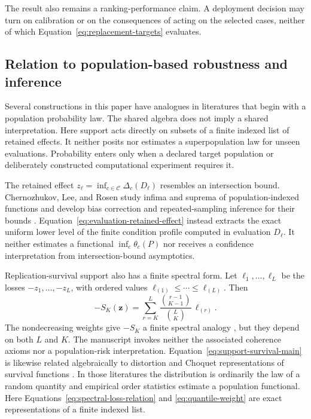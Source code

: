 \documentclass[11pt]{article}
\newcommand{\CSet}{\mathcal{C}}
\theoremstyle{remark}
\begin{document}
The result also remains a ranking-performance claim. A deployment decision may turn on calibration or on the consequences of acting on the selected cases, neither of which Equation~\eqref{eq:replacement-targets} evaluates.

\subsection{Relation to population-based robustness and inference}
\label{sec:related-frameworks}

Several constructions in this paper have analogues in literatures that begin
with a population probability law. The shared algebra does not imply a shared
interpretation. Here support acts directly on subsets of a finite indexed list
of retained effects. It neither posits nor estimates a superpopulation law for
unseen evaluations. Probability enters only when a declared target population
or deliberately constructed computational experiment requires it.

The retained effect $z_\ell=\inf_{c\in\CSet}\Delta_c(D_\ell)$ resembles an
intersection bound. Chernozhukov, Lee, and Rosen study infima and suprema of
population-indexed functions and develop bias correction and repeated-sampling
inference for their bounds \cite{chernozhukov2013intersection}. Equation~\eqref{eq:evaluation-retained-effect}
instead extracts the exact uniform lower level of the finite condition profile
computed in evaluation $D_\ell$. It neither estimates a functional
$\inf_c\theta_c(P)$ nor receives a confidence interpretation from
intersection-bound asymptotics.

Replication-survival support also has a finite spectral form. Let
$\ell_1,\ldots,\ell_L$ be the losses $-z_1,\ldots,-z_L$, with ordered values
$\ell_{(1)}\leq\cdots\leq\ell_{(L)}$. Then
\begin{equation}
-S_K(\mathbf z)
=
\sum_{r=K}^L
\frac{\binom{r-1}{K-1}}{\binom{L}{K}}\,
\ell_{(r)}.
\label{eq:spectral-loss-relation}
\end{equation}
The nondecreasing weights give $-S_K$ a finite spectral analogy
\cite{acerbi2002spectral}, but they depend on both $L$ and $K$. The manuscript
invokes neither the associated coherence axioms nor a population-risk
interpretation. Equation~\eqref{eq:support-survival-main} is likewise related
algebraically to distortion and Choquet representations of survival functions
\cite{wang1996premium}. In those literatures the distribution is ordinarily
the law of a random quantity and empirical order statistics estimate a
population functional. Here Equations~\eqref{eq:spectral-loss-relation} and
\eqref{eq:quantile-weight} are exact representations of a finite indexed list.
\end{document}
